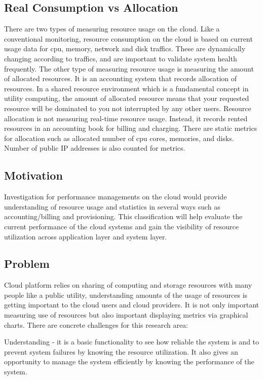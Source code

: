 \documentclass{sig-alternate-05-2015}
\begin{document}
\subsection{Real Consumption vs Allocation}
There are two types of measuring resource usage on the cloud. Like a conventional monitoring, resource consumption on the cloud is based on current usage data for cpu, memory, network and disk traffics. These are dynamically changing according to traffics, and are important to validate system health frequently. The other type of measuring resource usage is measuring the amount of allocated resources. It is an accounting system that records allocation of resources. In a shared resource environment which is a fundamental concept in utility computing, the amount of allocated resource means that your requested resource will be dominated to you not interrupted by any other users. Resource allocation is not measuring real-time resource usage. Instead, it records rented resources in an accounting book for billing and charging. There are static metrics for allocation such as allocated number of cpu cores, memories, and disks. Number of public IP addresses is also counted for metrics.

\subsection{Motivation}

Investigation for performance managements on the cloud would provide understanding of resource usage and statistics in several ways such as accounting/billing and provisioning. This classification will help evaluate the current performance of the cloud systems and gain the visibility of resource utilization across application layer and system layer. 

\subsection{Problem}

Cloud platform relies on sharing of computing and storage resources with many people like a public utility, understanding amounts of the usage of resources is getting important to the cloud users and cloud providers. It is not only important measuring use of resources but also important displaying metrics via graphical charts. There are concrete challenges for this research area: 

Understanding - it is a basic functionality to see how reliable the system is and to prevent system failures by knowing the resource utilization. It also gives an opportunity to manage the system efficiently by knowing the performance of the system. 
\end{document}
